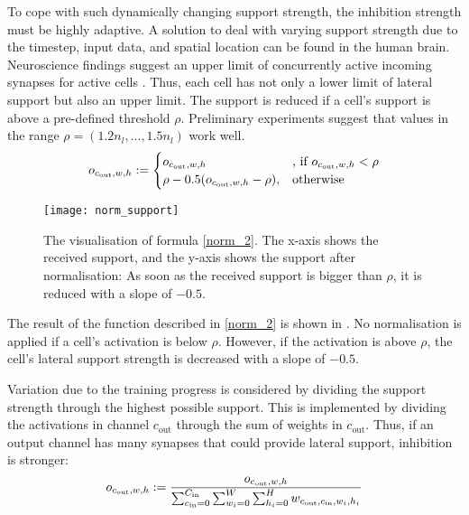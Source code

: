 To cope with such dynamically changing support strength, the inhibition strength must be highly adaptive.
A solution to deal with varying support strength due to the timestep, input data, and spatial location can be found in the human brain.
Neuroscience findings suggest an upper limit of concurrently active incoming synapses for active cells . Thus, each cell has not only a lower limit of lateral support but also an upper limit.
The support is reduced if a cell's support is above a pre-defined threshold $\rho$.
Preliminary experiments suggest that values in the range $\rho = (1.2n_l, ..., 1.5n_l)$ work well.
%
\begin{align}\eqlbl{norm_2}
	o_{c_{\text{out}},w,h} := \begin{cases}
      		o_{c_{\text{out}},w,h} & \text{, if } o_{c_{\text{out}},w,h} < \rho \\
      		\rho - 0.5(o_{c_{\text{out}},w,h} - \rho), & \text{otherwise}
    	\end{cases}
\end{align}
%
\begin{figure}[h]
    \centering
    \texttt{[image: norm\_support]}
    \caption[Inhibition for too many activated cells]{The visualisation of formula \eqref{norm_2}. The x-axis shows the received support, and the y-axis shows the support after normalisation: As soon as the received support is bigger than $\rho$, it is reduced with a slope of $-0.5$.}
\end{figure}
The result of the function described in \eqref{norm_2} is shown in . No normalisation is applied if a cell's activation is below $\rho$. However, if the activation is above $\rho$, the cell's lateral support strength is decreased with a slope of $-0.5$.

Variation due to the training progress is considered by dividing the support strength through the highest possible support. This is implemented by dividing the activations in channel $c_{\text{out}}$ through the sum of weights in $c_{\text{out}}$. Thus, if an output channel has many synapses that could provide lateral support, inhibition is stronger:
%
\begin{align}\eqlbl{norm_1}
    o_{c_{\text{out}},w,h} := \frac{o_{c_{\text{out}},w,h}}{\sum_{c_{\text{in}}=0}^{C_{\text{in}}} \sum_{w_i=0}^{W} \sum_{h_i=0}^{H} w_{c_{\text{out}}, c_{\text{in}},w_i,h_i}}
\end{align}
%

